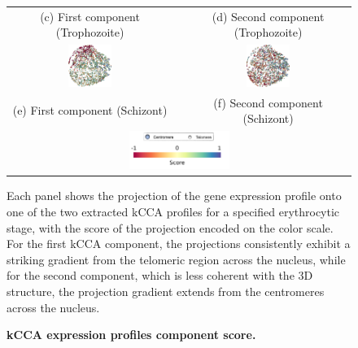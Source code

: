\begin{figure}
\begin{center}
{\begin{tabular}{ccc}
      (c) First component (Trophozoite) & \hspace{0.1\textwidth} & (d) Second component (Trophozoite) \\
        \includegraphics[width=0.28\textwidth, angle=-25]{suppFigs/kCCA/SCHIZONTS-kcca-genes-1.png} & \hspace{0.1\textwidth} & \includegraphics[width=0.28\textwidth, angle=-25]{suppFigs/kCCA/SCHIZONTS-kcca-genes-2.png} \\
      (e) First component (Schizont) & \hspace{0.1\textwidth} & (f) Second component (Schizont) \\
      \multicolumn{3}{c}{\includegraphics[width=0.3\textwidth]{suppFigs/kCCA/legend.png}} \\
    \end{tabular}
}
\end{center}
\caption{{\bf kCCA expression profiles component score.}}  { Each
  panel shows the projection of the gene expression profile onto one
  of the two extracted kCCA profiles for a specified erythrocytic
  stage, with the score of the projection encoded on the color
  scale. For the first kCCA component, the projections consistently
  exhibit a striking gradient from the telomeric region across
  the nucleus, while for the second component, which is less coherent
  with the 3D structure, the projection gradient extends from the
  centromeres across the nucleus.  }
\label{suppfig:kCCAsecond}
\end{figure}
\clearpage


